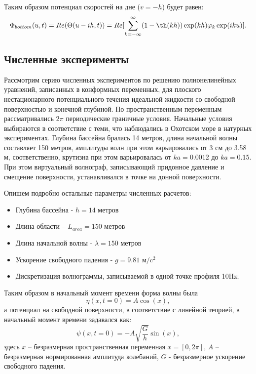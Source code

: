 Таким образом потенциал скоростей на дне ($v=-h$) будет равен:
\begin{equation}\label{eq:PotentialBottom}
\Phi_{bottom}(u,t)=Re(\Theta(u-ih,t))=Re[\sum\limits_{k=-\infty}^{\infty}(1-\th(kh))\exp(kh)\varphi_k\exp(iku)].
\end{equation}

\subsection{Численные эксперименты }

Рассмотрим серию численных экспериментов по решению полнонелинейных уравнений, записанных в конформных переменных, для плоского нестационарного потенциального течения идеальной жидкости со свободной поверхностью и конечной глубиной. По пространственным переменным рассматривались $2\pi$ периодические граничные условия. Начальные условия выбираются в соответствие с теми, что наблюдались в Охотском море в натурных экспериментах. Глубина бассейна бралась 14 метров, длина начальной волны  составляет 150 метров, амплитуды волн при этом варьировались от 3 см до 3.58 м, соответственно, крутизна при этом варьировалась от $ka=0.0012$ до $ka=0.15$.  При этом виртуальный волнограф, записывающий придонное давление и смещение поверхности, устанавливался в точке на донной поверхности.

Опишем подробно остальные параметры численных расчетов:
\begin{itemize}
  \item Глубина бассейна - $h=14$ метров
  \item Длина области – $L_{area}=150$ метров
  \item Длина начальной волны - $\lambda=150$ метров
  \item Ускорение свободного падения - $g=9.81\text{ м}/\text{c}^2$
  \item Дискретизация волнограммы, записываемой в одной точке профиля 10Hz;
\end{itemize}

Таким образом в начальный момент времени форма волны была
\begin{equation}\label{eq:beginWave}
\eta(x,t=0)=A\cos(x),
\end{equation}
а потенциал на свободной поверхности, в соответствие с линейной теорией, в начальный момент времени задавался как:
\begin{equation}\label{eq:beginPotential}
\psi(x,t=0)=-A\sqrt{\frac{G}{h}}\sin(x),
\end{equation}
здесь $x$ – безразмерная пространственная переменная $x=[0,2\pi]$, $A$ – безразмерная нормированная амплитуда колебаний, $G$ - безразмерное ускорение свободного падения.

